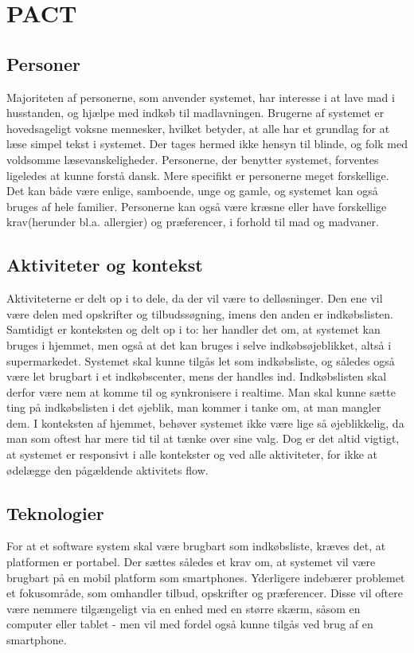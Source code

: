 \chapter{PACT}

\section{Personer}
Majoriteten af personerne, som anvender systemet, har interesse i at lave mad i husstanden, og hjælpe med indkøb til madlavningen.
Brugerne af systemet er hovedsageligt voksne mennesker, hvilket betyder, at alle har et grundlag for at læse simpel tekst i systemet.
Der tages hermed ikke hensyn til blinde, og folk med voldsomme læsevanskeligheder.
Personerne, der benytter systemet, forventes ligeledes at kunne forstå dansk.
Mere specifikt er personerne meget forskellige.
Det kan både være enlige, samboende, unge og gamle, og systemet kan også bruges af hele familier.
Personerne kan også være kræsne eller have forskellige krav(herunder bl.a. allergier) og præferencer, i forhold til mad og madvaner.

\section{Aktiviteter og kontekst}
Aktiviteterne er delt op i to dele, da der vil være to delløsninger. 
Den ene vil være delen med opskrifter og tilbudssøgning, imens den anden er indkøbslisten.
Samtidigt er konteksten og delt op i to: her handler det om, at systemet kan bruges i hjemmet, men også at det kan bruges i selve indkøbsøjeblikket, altså i supermarkedet.
Systemet skal kunne tilgås let som indkøbsliste, og således også være let brugbart i et indkøbscenter, mens der handles ind.
Indkøbslisten skal derfor være nem at komme til og synkronisere i realtime.
Man skal kunne sætte ting på indkøbslisten i det øjeblik, man kommer i tanke om, at man mangler dem.
I konteksten af hjemmet, behøver systemet ikke være lige så øjeblikkelig, da man som oftest har mere tid til at tænke over sine valg.
Dog er det altid vigtigt, at systemet er responsivt i alle kontekster og ved alle aktiviteter, for ikke at ødelægge den pågældende aktivitets flow. 

\section{Teknologier}
For at et software system skal være brugbart som indkøbsliste, kræves det, at platformen er portabel.
Der sættes således et krav om, at systemet vil være brugbart på en mobil platform som smartphones.
Yderligere indebærer problemet et fokusområde, som omhandler tilbud, opskrifter og præferencer.
Disse vil oftere være nemmere tilgængeligt via en enhed med en større skærm, såsom en computer eller tablet - men vil med fordel også kunne tilgås ved brug af en smartphone. 	